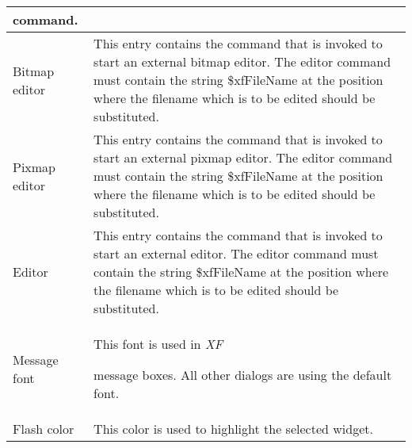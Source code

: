 {\begin{supertabular}{|l|p{6.5cm}|}
                               command.\\  \hline
Bitmap editor                & This entry contains the
                               command that is invoked to
                               start an external bitmap
                               editor. The editor command
                               must contain the string
                               \$xfFileName at the position
                               where the filename which is
                               to be edited should be
                               substituted.\\  \hline
Pixmap editor                & This entry contains the
                               command that is invoked to
                               start an external pixmap
                               editor. The editor command
                               must contain the string
                               \$xfFileName at the position
                               where the filename which is
                               to be edited should be
                               substituted.\\  \hline
Editor                       & This entry contains the
                               command that is invoked to
                               start an external editor. The
                               editor command must contain
                               the string \$xfFileName at
                               the position where the
                               filename which is to be
                               edited should be
                               substituted.\\  \hline
Message font                 & This font is used in {\em XF }

                               message boxes. All other
                               dialogs are using the default
                               font.\\  \hline
Flash color                  & This color is used to
                               highlight the selected
                               widget.\\ 
\end{supertabular}
}

{\newpage
\clearpage
\samepage \begin{figure}[hbt]
  \centerline{
  \epsfysize=4.7cm
  }
  
  \label{fig:The procedure XFProcOptionsInterpreter}
\end{figure}
}

